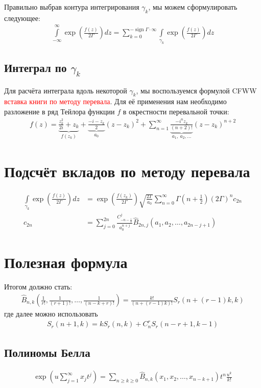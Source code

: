 \documentclass[a4paper, 12pt]{article}
\DeclareMathOperator*{\sign}{sign}
\newenvironment{eqw}{\begin{equation} \begin{aligned}}   
    {\end{aligned}    \end{equation}}
\begin{document}
Правильно выбрав контура интегрирования $\gamma_k$, мы можем сформулировать следующее:
\begin{eqw}
    \int\limits_{-\infty}^{\infty}\exp\left(\frac{f(z)}{2\Gamma}\right) dz = \sum\limits_{k=0}^{-\sign\Gamma \cdot \infty}
    \int\limits_{\gamma_k} \exp\left(\frac{f(z)}{2\Gamma}\right) dz
\end{eqw}
\subsection*{Интеграл по $\gamma_k$}
Для расчёта интеграла вдоль некоторой $\gamma_k$, мы воспользуемся формулой CFWW \textcolor{red}{вставка книги по методу перевала}. Для её применения нам необходимо разложение в ряд Тейлора функции $f$ в окрестности перевальной точки:
\begin{eqw}
    f(z) = \underbrace{\frac{z_k^2}{2i} + z_k}_{f(z_k)} + \underbrace{\frac{-i-z_k}{2}}_{a_0} (z-z_k)^2 + 
    \sum_{n=1}^{\infty} \underbrace{\frac{-i^n z_k}{(n+2)!}}_{a_1, \: a_2, \dots} (z-z_k)^{n+2}
\end{eqw}
\section*{Подсчёт вкладов по методу перевала}
\begin{eqw}
    \int\limits_{\gamma_k} \exp\left(\frac{f(z)}{2\Gamma}\right) dz 
    &= \exp\left(\frac{ f(z_k)}{2\Gamma} \right)\sqrt{\frac{2\Gamma}{a_0}}\sum\limits_{n=0}^{\infty} 
    \Gamma\left(n+\frac{1}{2}\right)\left(2\Gamma\right)^n c_{2n}\\
    c_{2n} &= \sum\limits_{j=0}^{2n} \frac{C_{-n-\frac{1}{2}}^j}{a_0^{n+j}}\hat{B}_{2n, j}\left(a_1, a_2, \dots, a_{2n-j+1}\right)
\end{eqw}
\section*{Полезная формула}
Итогом должно стать:
\begin{eqw}
    \hat{B}_{n, k}\left(\frac{1}{r!}, \frac{1}{(r+1)!}, \dots, \frac{1}{(n-k+r)!}\right) = 
    \frac{k!}{(n+(r-1)k)!}S_{r}(n+(r-1)k, k)
\end{eqw}
где далее можно использовать
\begin{eqw}
    S_r(n+1, k) = k S_r(n, k) + C_n^{r} S_r(n-r+1, k-1)
\end{eqw}
\subsection*{Полиномы Белла}
\begin{eqw}
    \exp\left(u \sum\limits_{j=1}^{\infty}x_j t^j\right) = \sum\limits_{n\geq k\geq 0} 
    \hat{B}_{n,k}\left(x_1, x_2, \dots, x_{n-k+1}\right) t^n \frac{u^k}{k!}
\end{eqw}
\end{document}
